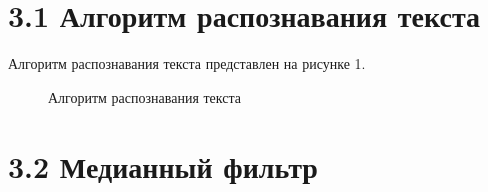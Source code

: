 \documentclass[14pt,a4paper]{extreport}
\begin{document}
                  \section*{\normalsize\hspace{4ex} 3.1 Алгоритм распознавания текста}
\hspace{4ex} Алгоритм распознавания текста представлен на рисунке 1.                  
                  \begin{figure}[h!]
\caption{Алгоритм распознавания текста}
\end{figure}


                  \section*{\normalsize\hspace{4ex} 3.2 Медианный фильтр}
\end{document}
